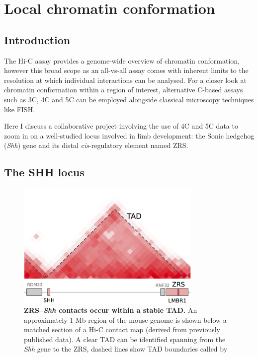 \documentclass[a4paper,11pt,oneside]{book}
\begin{document}

\chapter{Local chromatin conformation}\label{chap:shh}

\section{Introduction}

The Hi-C assay provides a genome-wide overview of chromatin conformation, however this broad scope as an all-vs-all assay comes with inherent limits to the resolution at which individual interactions can be analysed. For a closer look at chromatin conformation within a region of interest, alternative C-based assays such as 3C, 4C and 5C can be employed alongside classical microscopy techniques like FISH.

Here I discuss a collaborative project involving the use of 4C and 5C data to zoom in on a well-studied locus involved in limb development: the Sonic hedgehog (\emph{Shh}) gene and its distal \emph{cis}-regulatory element named ZRS.

\section{The SHH locus}

\begin{figure}
\begin{center} 
\includegraphics[width=3.5in]{shhtad.png}
\captionsetup{width=\textwidth} 
\caption[ZRS--\emph{Shh} contacts occur within a stable TAD.]{ {\bf ZRS--\emph{Shh} contacts occur within a stable TAD. }
An approximately 1 Mb region of the mouse genome is shown below a matched section of a Hi-C contact map (derived from previously published data\cite{Dixon2012}). A clear TAD can be identified spanning from the \emph{Shh} gene to the ZRS, dashed lines show TAD boundaries called by \citet{Dixon2012} %
}\label{fig:shhtad}
\end{center} 
\end{figure} 
\end{document}
